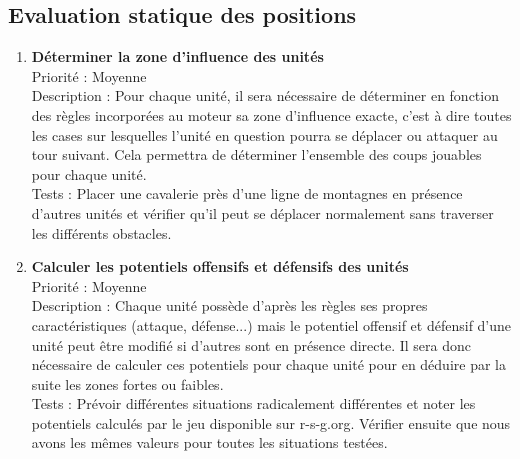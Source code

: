 		\subsection{Evaluation statique des positions}

			\begin{enumerate}

				\item \textbf{Déterminer la zone d'influence des unités} 
				\\[0.7\baselineskip]
				Priorité : Moyenne 
				\\[0.7\baselineskip]
				Description : Pour chaque unité, il sera nécessaire de déterminer en fonction des règles incorporées au moteur sa zone d'influence exacte, 
				c'est à dire toutes les cases sur lesquelles l'unité en question pourra se déplacer ou attaquer au tour suivant. Cela permettra de déterminer 
				l'ensemble des coups jouables pour chaque unité. 
				\\[0.7\baselineskip]
				Tests : Placer une cavalerie près d'une ligne de montagnes en présence d'autres unités et vérifier qu'il peut se déplacer normalement sans traverser 
				les différents obstacles. 
				\\[0.7\baselineskip]

				\item \textbf{Calculer les potentiels offensifs et défensifs des unités} 
				\\[0.7\baselineskip]
				Priorité : Moyenne 
				\\[0.7\baselineskip]
				Description : Chaque unité possède d'après les règles ses propres caractéristiques (attaque, défense...) mais le potentiel offensif et défensif 
				d'une unité peut être modifié si d'autres sont en présence directe. Il sera donc nécessaire de calculer ces potentiels pour chaque unité pour en déduire 
				par la suite les zones fortes ou faibles. 
				\\[0.7\baselineskip]
				Tests : Prévoir différentes situations radicalement différentes et noter les potentiels calculés par le jeu disponible sur r-s-g.org. Vérifier ensuite 
				que nous avons les mêmes valeurs pour toutes les situations testées. 
				\\[0.7\baselineskip]


\end{enumerate}
